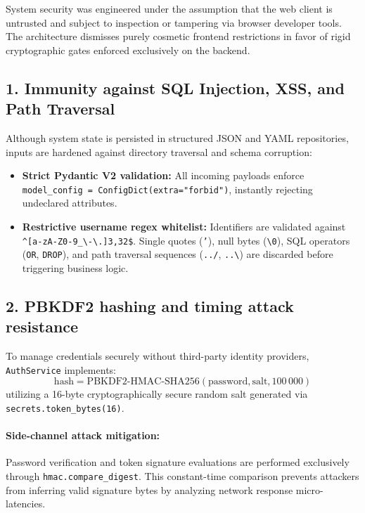 \documentclass[11pt,a4paper]{article}
\begin{document}
System security was engineered under the assumption that the web client is untrusted and subject to inspection or tampering via browser developer tools. The architecture dismisses purely cosmetic frontend restrictions in favor of rigid cryptographic gates enforced exclusively on the backend.

\subsection{1. Immunity against SQL Injection, XSS, and Path Traversal}
Although system state is persisted in structured JSON and YAML repositories, inputs are hardened against directory traversal and schema corruption:
\begin{itemize}[leftmargin=*]
    \item \textbf{Strict Pydantic V2 validation:} All incoming payloads enforce \texttt{model\_config = ConfigDict(extra="forbid")}, instantly rejecting undeclared attributes.
    \item \textbf{Restrictive username regex whitelist:} Identifiers are validated against \texttt{\textasciicircum[a-zA-Z0-9\_\textbackslash-\textbackslash.]{3,32}\$}. Single quotes (\texttt{'}), null bytes (\texttt{\textbackslash0}), SQL operators (\texttt{OR}, \texttt{DROP}), and path traversal sequences (\texttt{../}, \texttt{..\textbackslash}) are discarded before triggering business logic.
\end{itemize}

\subsection{2. PBKDF2 hashing and timing attack resistance}
To manage credentials securely without third-party identity providers, \texttt{AuthService} implements:
\begin{equation}
    \text{hash} = \text{PBKDF2-HMAC-SHA256}(\text{password}, \text{salt}, 100\,000)
\end{equation}
utilizing a 16-byte cryptographically secure random salt generated via \texttt{secrets.token\_bytes(16)}.

\paragraph{Side-channel attack mitigation:}
Password verification and token signature evaluations are performed exclusively through \texttt{hmac.compare\_digest}. This constant-time comparison prevents attackers from inferring valid signature bytes by analyzing network response micro-latencies.
\end{document}

